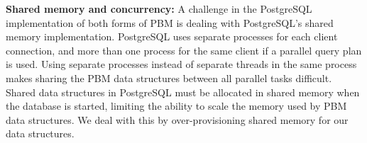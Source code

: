 




\textbf{Shared memory and concurrency:} A challenge in the PostgreSQL implementation of both forms of PBM is dealing with PostgreSQL's shared memory implementation. PostgreSQL uses separate processes for each client connection, and more than one process for the same client if a parallel query plan is used. Using separate processes instead of separate threads in the same process makes sharing the PBM data structures between all parallel tasks difficult. Shared data structures in PostgreSQL must be allocated in shared memory when the database is started, limiting the ability to scale the memory used by PBM data structures. We deal with this by over-provisioning shared memory for our data structures.



